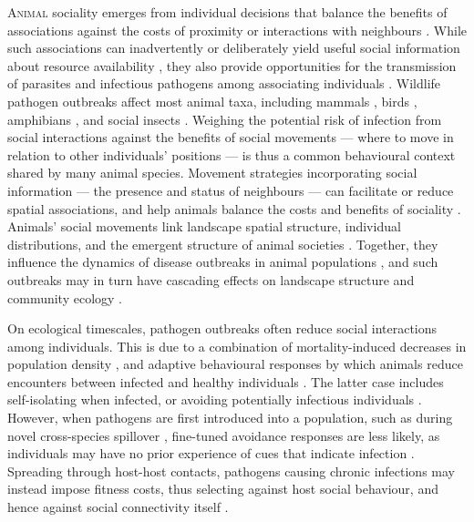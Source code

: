 

\lettrine{A}{nimal} sociality emerges from individual decisions that balance the benefits of associations against the costs of proximity or interactions with neighbours \autocite[][]{tanner2012,webber2018,webber2022,gil2018}.
While such associations can inadvertently or deliberately yield useful social information about resource availability \autocite{danchin2004,dall2005,gil2018}, they also provide opportunities for the transmission of parasites and infectious pathogens among associating individuals \autocite[][]{weinstein2018,romano2020,albery2021,cantor2021,romano2021}.
Wildlife pathogen outbreaks affect most animal taxa, including mammals \autocite{blehert2009,fereidouni2019,chandler2021,kuchipudi2022}, birds \autocite{wille2022}, amphibians \autocite{scheele2019}, and social insects \autocite{goulson2015}.
Weighing the potential risk of infection from social interactions against the benefits of social movements --- where to move in relation to other individuals' positions --- is thus a common behavioural context shared by many animal species.
Movement strategies incorporating social information --- the presence and status of neighbours --- can facilitate or reduce spatial associations, and help animals balance the costs and benefits of sociality \autocite{albery2021,gil2018,webber2018,webber2022}.
Animals' social movements link landscape spatial structure, individual distributions, and the emergent structure of animal societies \autocite{gil2018,webber2022,kurvers2014}.
Together, they influence the dynamics of disease outbreaks in animal populations \autocite{white2018a,romano2020,romano2021,keeling2001}, and such outbreaks may in turn have cascading effects on landscape structure and community ecology \autocite{monk2022}.

On ecological timescales, pathogen outbreaks often reduce social interactions among individuals.
This is due to a combination of mortality-induced decreases in population density \autocite[e.g.][]{fereidouni2019,monk2022}, and adaptive behavioural responses by which animals reduce encounters between infected and healthy individuals \autocite{stroeymeyt2018,pusceddu2021,stockmaier2021,weinstein2018}.
The latter case includes self-isolating when infected, or avoiding potentially infectious individuals \autocite{stroeymeyt2018,pusceddu2021,stockmaier2021,weinstein2018}.
However, when pathogens are first introduced into a population, such as during novel cross-species spillover \autocite{kuchipudi2022,chandler2021}, fine-tuned avoidance responses are less likely, as individuals may have no prior experience of cues that indicate infection \autocite{weinstein2018,stockmaier2021}.
Spreading through host-host contacts, pathogens causing chronic infections \autocite{bastos2000,jolles2021,vosloo2009} may instead impose fitness costs, thus selecting against host social behaviour, and hence against social connectivity itself \autocite{altizer2003,cantor2021,romano2021,poulin2021,ashby2022}.


